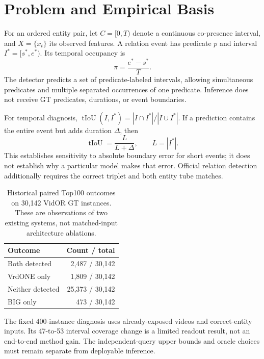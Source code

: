 \section{Problem and Empirical Basis}
For an ordered entity pair, let $C=[0,T)$ denote a continuous co-presence interval,
and $X=\{x_t\}$ its observed features. A relation event has predicate $p$ and
interval $I^*=[s^*,e^*)$. Its temporal occupancy is
\begin{equation}
\pi=\frac{e^*-s^*}{T}.
\end{equation}
The detector predicts a set of predicate-labeled intervals, allowing simultaneous
predicates and multiple separated occurrences of one predicate. Inference does
not receive GT predicates, durations, or event boundaries.

For temporal diagnosis, $\operatorname{tIoU}(I,I^*)=|I\cap I^*|/|I\cup I^*|$.
If a prediction contains the entire event but adds duration $\Delta$, then
\begin{equation}
\operatorname{tIoU}=\frac{L}{L+\Delta},\qquad L=|I^*|.
\end{equation}
This establishes sensitivity to absolute boundary error for short events; it
does not establish why a particular model makes that error. Official relation
detection additionally requires the correct triplet and both entity tube matches.

\begin{table}[t]
\centering\small
\caption{Historical paired Top100 outcomes on 30,142 VidOR GT instances. These are
observations of two existing systems, not matched-input architecture ablations.}
\begin{tabular}{lr}
\toprule Outcome & Count / total \\
\midrule Both detected & 2,487 / 30,142 \\
VrdONE only & 1,809 / 30,142 \\
Neither detected & 25,373 / 30,142 \\
BIG only & 473 / 30,142 \\
\bottomrule
\end{tabular}
\end{table}

The fixed 400-instance diagnosis uses already-exposed videos and correct-entity
inputs. Its 47-to-53 interval coverage change is a limited readout result, not an
end-to-end method gain. The independent-query upper bounds and oracle choices
must remain separate from deployable inference.
